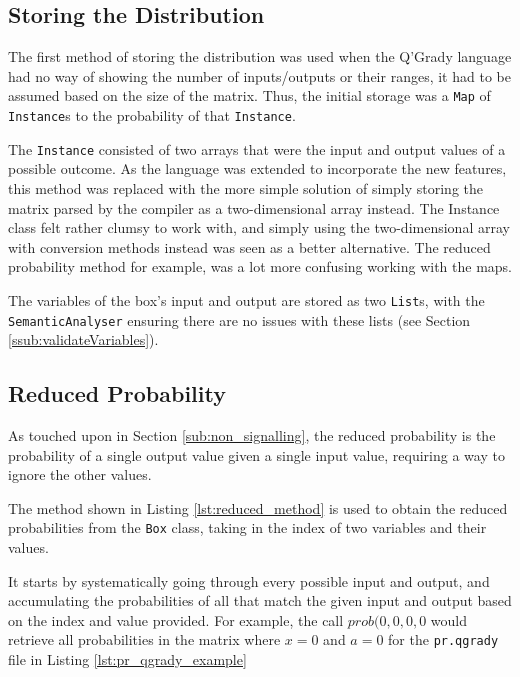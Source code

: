 \documentclass[report.tex]{subfiles}
\begin{document}
\subsection{Storing the Distribution} %
\label{sub:storing_the_distribution}
The first method of storing the distribution was used when the Q'Grady language
had no way of showing the number of inputs/outputs or their ranges, it had to be
assumed based on the size of the matrix. Thus, the initial storage was a
\texttt{Map} of \texttt{Instance}s to the probability of that \texttt{Instance}.

The \texttt{Instance} consisted of two arrays that were the input and output
values of a possible outcome. As the language was extended to incorporate
the new features, this method was replaced with the more simple solution of
simply storing the matrix parsed by the compiler as a two-dimensional array
instead. The Instance class felt rather clumsy to work with, and simply using
the two-dimensional array with conversion methods instead was seen as a better
alternative. The reduced probability method for example, was a lot more
confusing working with the maps.

The variables of the box's input and output are stored as two \texttt{List}s,
with the \texttt{SemanticAnalyser} ensuring there are no issues with these
lists (see Section \ref{ssub:validateVariables}).

\subsection{Reduced Probability} %
\label{sub:reduced_probability}
As touched upon in Section \ref{sub:non_signalling}, the reduced probability is
the probability of a single output value given a single input value, requiring
a way to ignore the other values.

 

The method shown in Listing \ref{lst:reduced_method} is used to obtain the
reduced probabilities from the \texttt{Box} class, taking in the index of
two variables and their values.

It starts by systematically going through every possible input and output, and
accumulating the probabilities of all that match the given input and output
based on the index and value provided. For example, the call \(prob(0, 0, 0, 0\)
would retrieve all probabilities in the matrix where \(x = 0\) and \(a = 0\)
for the \texttt{pr.qgrady} file in Listing \ref{lst:pr_qgrady_example}
\end{document}
